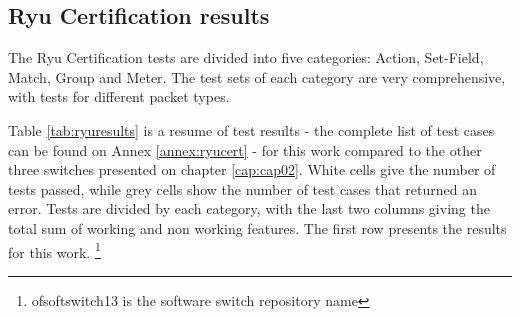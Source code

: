 \subsection{Ryu Certification results}

The Ryu Certification tests are divided into five categories: Action, Set-Field, Match, Group and Meter. The test sets of each category are very comprehensive, with tests for different packet types.

Table \ref{tab:ryuresults} is a resume of test results - the complete list of test cases can be found on Annex \ref{annex:ryucert} - for this work compared to the other three switches presented on chapter \ref{cap:cap02}. White cells give the number of tests passed, while grey cells show the number of test cases that returned an error. Tests are divided by each category, with the last two columns giving the total sum of working and non working features. The first row presents the results for this work. \footnote{ofsoftswitch13 is the software switch repository name} 

\begin{table}[h]
\centering
\caption{Ryu Certification results comparison}
\label{tab:ryuresults}
\end{table}

